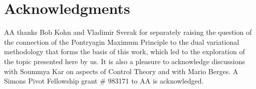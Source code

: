 \documentclass[11pt]{article}
\begin{document}
\section*{Acknowledgments}
AA thanks Bob Kohn and Vladimir Sverak for separately raising the question of the connection of the Pontryagin Maximum Principle to the dual variational methodology that forms the basis of this work, which led to the exploration of the topic presented here by us. It is also a pleasure to acknowledge discussions with Soummya Kar on aspects of Control Theory and with Mario Berges. A Simons Pivot Fellowship grant \# 983171 to AA is acknowledged.

\printbibliography
\end{document}
